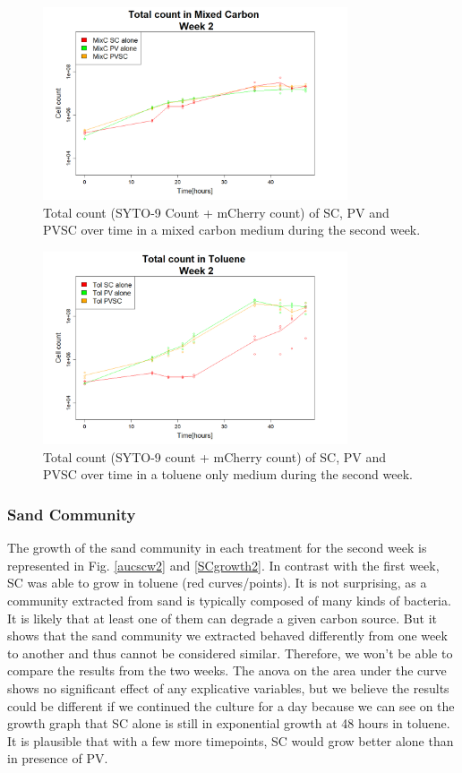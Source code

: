 \documentclass[a4paper, 10pt, conference]{ieeeconf}   %
\begin{document}
\begin{figure}[H]
	\centering
	\includegraphics[width=9cm]{totcount_mixC2.PNG}
	\caption{Total count (SYTO-9 Count + mCherry count) of SC, PV and PVSC over time in a mixed carbon medium during the second week.}
	\label{totcountmixC2text}
\end{figure}
\vspace{-0.4cm}
\begin{figure}[H]
	\centering
	\includegraphics[width=9cm]{totcount_tol2.PNG}
	\caption{Total count (SYTO-9 count + mCherry count) of SC, PV and PVSC over time in a toluene only medium during the second week.}
	\label{totcounttol2text}
\end{figure}
\subsubsection{Sand Community}
The growth of the sand community in each treatment for the second week is represented in Fig. \ref{aucscw2} and \ref{SCgrowth2}.
In contrast with the first week, SC was able to grow in toluene (red curves/points). It is not surprising, as a community extracted from sand is typically composed of many kinds of bacteria. It is likely that at least one of them can degrade a given carbon source. But it shows that the sand community we extracted behaved differently from one week to another and thus cannot be considered similar. Therefore, we won't be able to compare the results from the two weeks. 
The anova on the area under the curve shows no significant effect of any explicative variables, but we believe the results could be different if we continued the culture for a day because we can see on the growth graph that SC alone is still in exponential growth at 48 hours in toluene. It is plausible that with a few more timepoints, SC would grow better alone than in presence of PV.\newline
\end{document}
